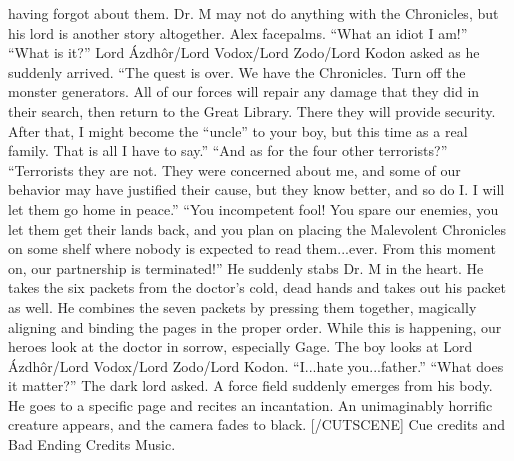 \documentclass{gd-document}
\begin{document}
\begin{enumerate}
\begin{enumerate}
      having forgot about them. Dr. M may not do anything with the
      Chronicles, but his lord is another story altogether. Alex
      facepalms. “What an idiot I am!” “What is it?” Lord Ázdhôr/Lord
      Vodox/Lord Zodo/Lord Kodon asked as he suddenly arrived. “The
      quest is over. We have the Chronicles. Turn off the monster
      generators. All of our forces will repair any damage that they
      did in their search, then return to the Great Library. There
      they will provide security. After that, I might become the
      “uncle” to your boy, but this time as a real family. That is all
      I have to say.” “And as for the four other terrorists?”
      “Terrorists they are not. They were concerned about me, and some
      of our behavior may have justified their cause, but they know
      better, and so do I. I will let them go home in peace.” “You
      incompetent fool! You spare our enemies, you let them get their
      lands back, and you plan on placing the Malevolent Chronicles on
      some shelf where nobody is expected to read them...ever. From
      this moment on, our partnership is terminated!” He suddenly
      stabs Dr. M in the heart. He takes the six packets from the
      doctor's cold, dead hands and takes out his packet as well. He
      combines the seven packets by pressing them together, magically
      aligning and binding the pages in the proper order. While this
      is happening, our heroes look at the doctor in sorrow,
      especially Gage. The boy looks at Lord Ázdhôr/Lord Vodox/Lord
      Zodo/Lord Kodon. “I...hate you...father.” “What does it matter?”
      The dark lord asked. A force field suddenly emerges from his
      body. He goes to a specific page and recites an incantation. An
      unimaginably horrific creature appears, and the camera fades to
      black. [/CUTSCENE] Cue credits and Bad Ending Credits Music. 


\end{enumerate}
\end{enumerate}
\end{document}

